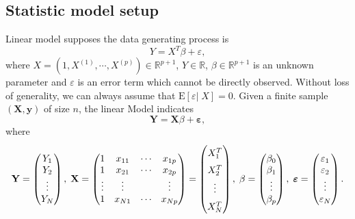 \documentclass{report}
\theoremstyle{nonumberplain}
\newcommand{\E}{\mathrm{E}}
\newcommand{\y}{\mathbf{y}}
\newcommand{\Y}{\mathbf{Y}}
\newcommand{\X}{\mathbf{X}}
\newcommand{\0}{\mathbf{0}}
\newcommand{\vep}{\bm{\varepsilon}}
\begin{document}
\subsection{Statistic model setup}
Linear model supposes the data generating process is
\[
Y= X^T\beta+\varepsilon,
\]
where $X=(1,X^{(1)},\cdots,X^{(p)})\in\mathbb{R}^{p+1}$, $Y\in\mathbb{R}$, $\beta\in\mathbb{R}^{p+1}$ is an unknown parameter and $\varepsilon$ is an error term which cannot be directly observed. Without loss of generality, we can always assume that $\E[\varepsilon|\;X]=0$.
Given a finite sample $(\X,\y)$ of size $n$, the linear Model indicates 
\[
\Y = \X \beta +\vep,
\]
where
\[
\Y=
\begin{pmatrix}
Y_1\\
Y_2\\
\vdots\\
Y_N
\end{pmatrix}
,\;\X=
\begin{pmatrix}
1& x_{11}&\cdots& x_{1p}\\
1& x_{21}&\cdots &x_{2p}\\
\vdots&\vdots& &\vdots\\
1& x_{N1}&\cdots &x_{Np}
\end{pmatrix}
\renewcommand*{\arraystretch}{1.5}
=\begin{pmatrix}
X_1^T\\
X_2^T\\
\vdots\\
X_N^T
\end{pmatrix}
\renewcommand*{\arraystretch}{1}
,\;
\beta=
\begin{pmatrix}
\beta_0\\
\beta_1\\
\vdots\\
\beta_p
\end{pmatrix}
,\;
\vep=
\begin{pmatrix}
\varepsilon_1\\
\varepsilon_2\\
\vdots\\
\varepsilon_N
\end{pmatrix}.
\]
\end{document}
